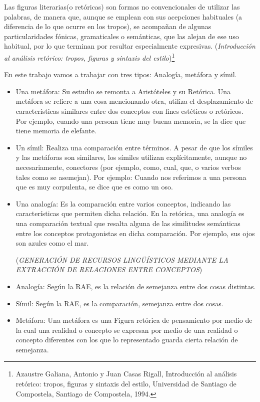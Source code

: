  Las figuras literarias(o retóricas) son formas no convencionales de utilizar las palabras, de manera que, aunque se emplean con sus acepciones habituales (a diferencia de lo que ocurre en los tropos), se acompañan de algunas particularidades fónicas, gramaticales o semánticas, que las alejan de ese uso habitual, por lo que terminan por resultar especialmente expresivas. (\textit {Introducción al análisis retórico: tropos, figuras y sintaxis del estilo})\footnote{Azaustre Galiana, Antonio y Juan Casas Rigall, Introducción al análisis retórico: tropos, figuras y sintaxis del estilo, Universidad de Santiago de Compostela, Santiago de Compostela, 1994.}

En este trabajo vamos a trabajar con tres tipos: Analogía, metáfora y símil.
\begin{itemize}
	\item Una metáfora: Su estudio se remonta a Aristóteles y su Retórica. Una metáfora se refiere a una cosa mencionando otra, utiliza el desplazamiento de características similares entre dos conceptos con fines estéticos o retóricos. Por ejemplo, cuando una persona tiene muy buena memoria, se la dice que tiene memoria de elefante.
	
	\item Un símil: Realiza una comparación entre términos. A pesar de que los símiles y las metáforas son similares, los símiles utilizan explícitamente, aunque no necesariamente, conectores (por ejemplo, como, cual, que, o varios verbos tales como se asemejan).
	Por ejemplo: Cuando nos referimos a una persona que es muy corpulenta, se dice que es como un oso.
	
	\item Una analogía: Es la comparación entre varios conceptos, indicando las características que permiten dicha relación. En la retórica, una analogía es una comparación textual que resalta alguna de las similitudes semánticas entre los conceptos protagonistas en dicha comparación. Por ejemplo, sus ojos son azules como el mar.
	
(\textit {GENERACIÓN DE RECURSOS LINGÜÍSTICOS MEDIANTE LA EXTRACCIÓN DE RELACIONES ENTRE CONCEPTOS})	
	
\end{itemize}

\begin{itemize}
\item Analogía: Según la RAE, es la relación de semejanza entre dos cosas distintas.
\item Símil: Según la RAE, es la comparación, semejanza entre dos cosas.
\item Metáfora: Una metáfora es una Figura retórica de pensamiento por medio de la cual una realidad o concepto se expresan por medio de una realidad o concepto diferentes con los que lo representado guarda cierta relación de semejanza.
\end{itemize}



